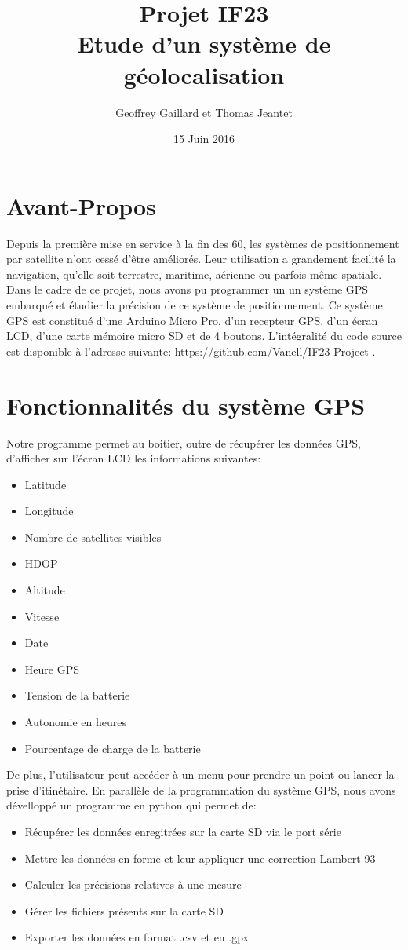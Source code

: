 \documentclass[a4paper,12pt]{article}
\author{Geoffrey Gaillard et Thomas Jeantet}
\title{Projet IF23\\Etude d'un système de géolocalisation}
\date{15 Juin 2016}
\begin{document}
\maketitle
\newpage
\tableofcontents
\newpage


\section*{Avant-Propos}
Depuis la première mise en service à la fin des 60, les systèmes de positionnement par satellite n'ont cessé d'être améliorés. Leur utilisation a grandement facilité la navigation, qu'elle soit terrestre, maritime, aérienne ou parfois même spatiale. Dans le cadre de ce projet, nous avons pu programmer un un système GPS embarqué et étudier la précision de ce système de positionnement. Ce système GPS est constitué d'une Arduino Micro Pro, d'un recepteur GPS, d'un écran LCD, d'une carte mémoire micro SD et de 4 boutons. L'intégralité du code source est disponible à l'adresse suivante: https://github.com/Vanell/IF23-Project .
\section{Fonctionnalités du système GPS}
Notre programme permet au boitier, outre de récupérer les données GPS, d'afficher sur l'écran LCD les informations suivantes:
\begin{itemize}
\item Latitude
\item Longitude
\item Nombre de satellites visibles
\item HDOP
\item Altitude
\item Vitesse
\item Date
\item Heure GPS
\item Tension de la batterie
\item Autonomie en heures
\item Pourcentage de charge de la batterie

\end{itemize}

De plus, l'utilisateur peut accéder à un menu pour prendre un point ou lancer la prise d'itinétaire.
En parallèle de la programmation du système GPS, nous avons dévelloppé un programme en python qui permet de:
\begin{itemize}
\item Récupérer les données enregitrées sur la carte SD via le port série
\item Mettre les données en forme et leur appliquer une correction Lambert 93
\item Calculer les précisions relatives à une mesure
\item Gérer les fichiers présents sur la carte SD
\item Exporter les données en format .csv et en .gpx

\end{itemize}
\newpage
\end{document}

